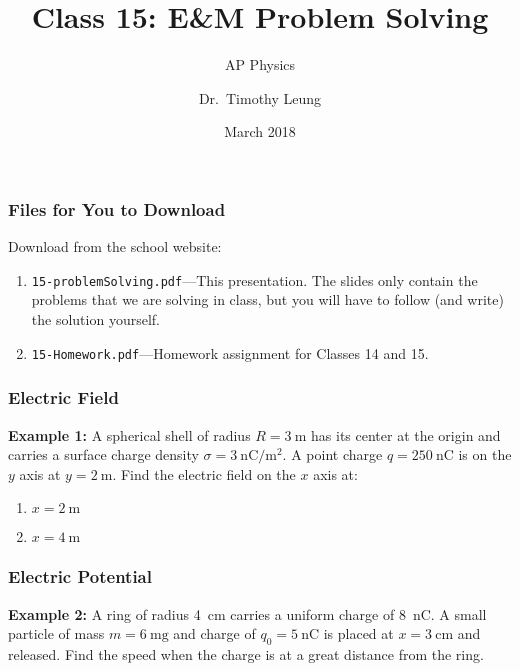 \documentclass[12pt,aspectratio=169]{beamer}
\title{Class 15: E\&M Problem Solving}
\subtitle{AP Physics}
\author[TML]{Dr.\ Timothy Leung}
\institute{Olympiads School}
\date{March 2018}
\begin{document}
\begin{frame}
  \maketitle
\end{frame}


\begin{frame}
  \frametitle{Files for You to Download}
  Download from the school website:
  \begin{enumerate}
  \item\texttt{15-problemSolving.pdf}---This presentation. The slides only
    contain the problems that we are solving in class, but you will have to
    follow (and write) the solution yourself.
  \item\texttt{15-Homework.pdf}---Homework assignment for Classes 14 and 15.
  \end{enumerate}

\end{frame}


\begin{frame}
  \frametitle{Electric Field \footnotemark}
  \textbf{Example 1:} A spherical shell of radius $R=\SI{3}{\metre}$ has its
  center at the origin and carries a surface charge density
  $\sigma=\SI{3}{\nano\coulomb/\metre^2}$. A point charge
  $q=\SI{250}{\nano\coulomb}$ is on the $y$ axis at $y=\SI{2}{\metre}$. Find
  the electric field on the $x$ axis  at:
  \begin{enumerate}
  \item $x=\SI{2}{\metre}$
  \item $x=\SI{4}{\metre}$
  \end{enumerate}
\end{frame}


\begin{frame}
  \frametitle{Electric Potential \footnotemark}
  \textbf{Example 2:} A ring of radius \SI{4}{\centi\metre} carries a uniform
  charge of \SI{8}{\nano\coulomb}. A small particle of mass
  $m=\SI{6}{\milli\gram}$ and charge of $q_0=\SI{5}{\nano\coulomb}$ is placed
  at $x=\SI{3}{\centi\metre}$ and released. Find the speed when the charge is
  at a great distance from the ring.

\end{frame}
\end{document}
